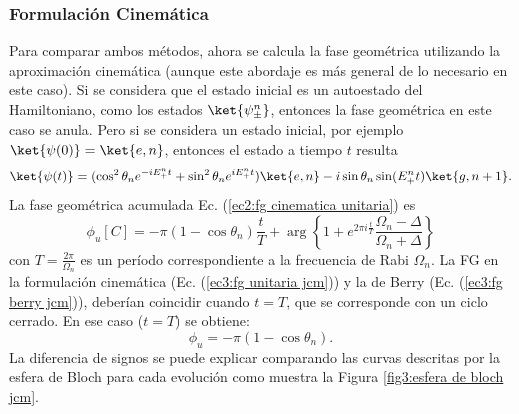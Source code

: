 \subsubsection{Formulación Cinemática}
Para comparar ambos métodos, ahora se calcula la fase geométrica utilizando la aproximación cinemática (aunque este abordaje es más general de lo necesario en este caso).
Si se considera que el estado inicial es un autoestado del Hamiltoniano, como los estados $\ket{\psi_\pm^n}$, entonces la fase geométrica en este caso se anula. Pero si se considera un estado inicial, por ejemplo $\ket{\psi(0)}=\ket{e,n}$, entonces el estado a tiempo $t$ resulta
\begin{equation}\label{ec3:fg berry jcm}
    \ket{\psi(t)}=(\cos^2\theta_ne^{-iE_+^nt}+\sin^2\theta_ne^{iE_+^nt})\ket{e,n}-i \sin\theta_n\sin(E_+^nt)\ket{g,n+1}.
\end{equation}
La fase geométrica acumulada Ec. (\ref{ec2:fg cinematica unitaria}) es
\begin{equation}\label{ec3:fg unitaria jcm}
    \phi_u[C]=-\pi(1-\cos\theta_n)\frac{t}{T} +\arg\left\{ 1+e^{2\pi i \frac{t}{T}}\frac{\Omega_n-\Delta}{\Omega_n+\Delta} \right\}
\end{equation}
con $T=\frac{2\pi}{\Omega_n}$ es un período correspondiente a la frecuencia de Rabi $\Omega_n$. La FG en la formulación cinemática (Ec. (\ref{ec3:fg unitaria jcm})) y la de Berry (Ec. (\ref{ec3:fg berry jcm})), deberían coincidir cuando $t=T$, que se corresponde con un ciclo cerrado. En ese caso ($t=T$) se obtiene:
\begin{equation}
    \phi_u=-\pi(1-\cos\theta_n).
\end{equation}
La diferencia de signos se puede explicar comparando las curvas descritas por la esfera de Bloch para cada evolución como muestra la Figura \ref{fig3:esfera de bloch jcm}. 
